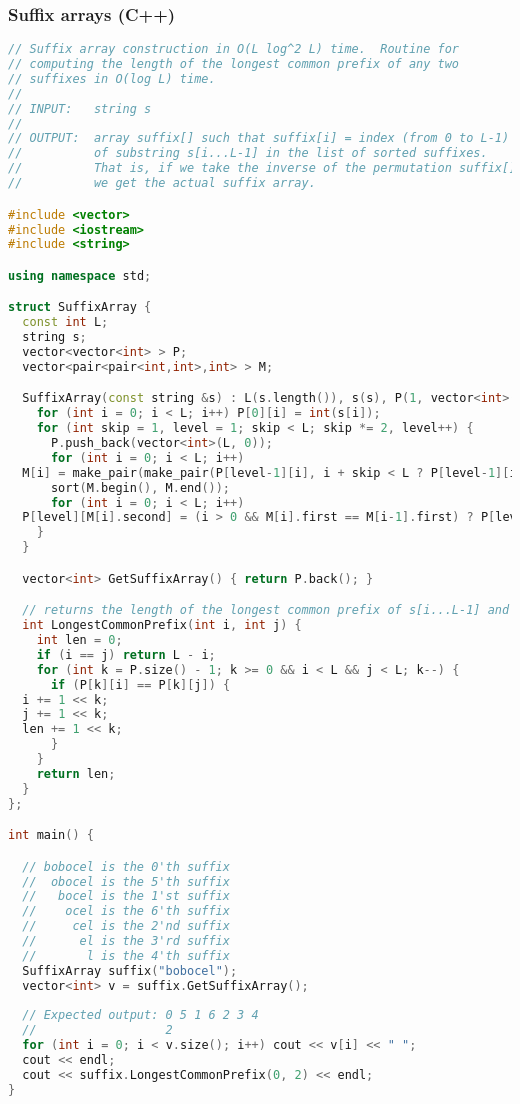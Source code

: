 \subsubsection{Suffix arrays (C++)}
\begin{lstlisting}[language=C++]
// Suffix array construction in O(L log^2 L) time.  Routine for
// computing the length of the longest common prefix of any two
// suffixes in O(log L) time.
//
// INPUT:   string s
//
// OUTPUT:  array suffix[] such that suffix[i] = index (from 0 to L-1)
//          of substring s[i...L-1] in the list of sorted suffixes.
//          That is, if we take the inverse of the permutation suffix[],
//          we get the actual suffix array.

#include <vector>
#include <iostream>
#include <string>

using namespace std;

struct SuffixArray {
  const int L;
  string s;
  vector<vector<int> > P;
  vector<pair<pair<int,int>,int> > M;

  SuffixArray(const string &s) : L(s.length()), s(s), P(1, vector<int>(L, 0)), M(L) {
    for (int i = 0; i < L; i++) P[0][i] = int(s[i]);
    for (int skip = 1, level = 1; skip < L; skip *= 2, level++) {
      P.push_back(vector<int>(L, 0));
      for (int i = 0; i < L; i++) 
  M[i] = make_pair(make_pair(P[level-1][i], i + skip < L ? P[level-1][i + skip] : -1000), i);
      sort(M.begin(), M.end());
      for (int i = 0; i < L; i++) 
  P[level][M[i].second] = (i > 0 && M[i].first == M[i-1].first) ? P[level][M[i-1].second] : i;
    }    
  }

  vector<int> GetSuffixArray() { return P.back(); }

  // returns the length of the longest common prefix of s[i...L-1] and s[j...L-1]
  int LongestCommonPrefix(int i, int j) {
    int len = 0;
    if (i == j) return L - i;
    for (int k = P.size() - 1; k >= 0 && i < L && j < L; k--) {
      if (P[k][i] == P[k][j]) {
  i += 1 << k;
  j += 1 << k;
  len += 1 << k;
      }
    }
    return len;
  }
};

int main() {

  // bobocel is the 0'th suffix
  //  obocel is the 5'th suffix
  //   bocel is the 1'st suffix
  //    ocel is the 6'th suffix
  //     cel is the 2'nd suffix
  //      el is the 3'rd suffix
  //       l is the 4'th suffix
  SuffixArray suffix("bobocel");
  vector<int> v = suffix.GetSuffixArray();
  
  // Expected output: 0 5 1 6 2 3 4
  //                  2
  for (int i = 0; i < v.size(); i++) cout << v[i] << " ";
  cout << endl;
  cout << suffix.LongestCommonPrefix(0, 2) << endl;
}

\end{lstlisting}
